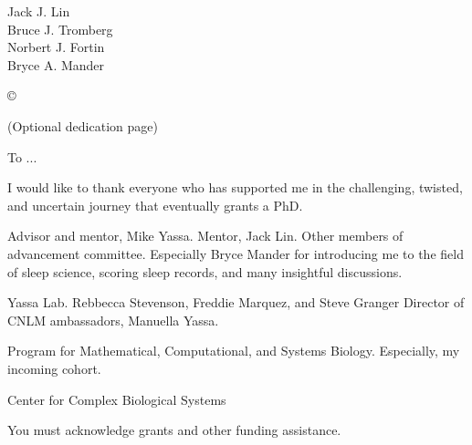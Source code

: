 




\othercommitteemembers
{
  Jack J. Lin\\
  Bruce J. Tromberg\\
  Norbert J. Fortin\\
  Bryce A. Mander
}


\copyrightdeclaration
{
  {\copyright} {\Degreeyear} \Authorname
}


\dedications
{
  (Optional dedication page)
  
  To ...
}

\acknowledgments
{
  I would like to thank everyone who has supported me in the challenging, twisted, and uncertain journey that eventually grants a PhD.
  
  Advisor and mentor, Mike Yassa.
  Mentor, Jack Lin.
  Other members of advancement committee. Especially Bryce Mander for introducing me to the field of sleep science, scoring sleep records, and many insightful discussions. 
  
  Yassa Lab. Rebbecca Stevenson, Freddie Marquez, and Steve Granger
  Director of CNLM ambassadors, Manuella Yassa.
  
  Program for Mathematical, Computational, and Systems Biology. Especially, my incoming cohort.
  
  Center for Complex Biological Systems
  
  You must acknowledge grants and other funding assistance. 

}

